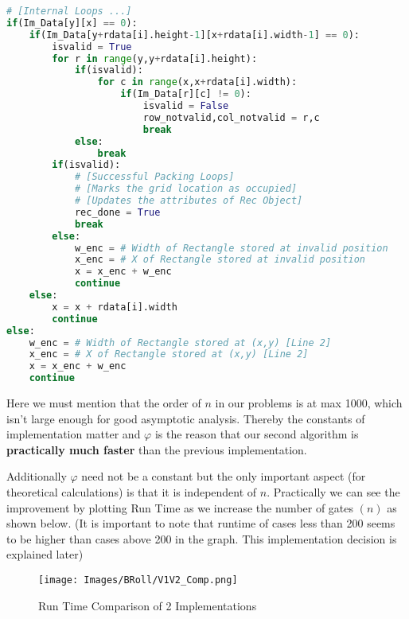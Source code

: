 \documentclass[12pt, a4paper,openany]{article}
\begin{document}
\begin{lstlisting}[language=Python, caption= Inner loops of Predictive Pixel Scan Implementation]
# [Internal Loops ...]
if(Im_Data[y][x] == 0):
    if(Im_Data[y+rdata[i].height-1][x+rdata[i].width-1] == 0):
        isvalid = True
        for r in range(y,y+rdata[i].height):
            if(isvalid):
                for c in range(x,x+rdata[i].width):
                    if(Im_Data[r][c] != 0):
                        isvalid = False
                        row_notvalid,col_notvalid = r,c
                        break                                            
            else:
                break        
        if(isvalid):
            # [Successful Packing Loops]
            # [Marks the grid location as occupied]
            # [Updates the attributes of Rec Object]
            rec_done = True
            break
        else:
            w_enc = # Width of Rectangle stored at invalid position
            x_enc = # X of Rectangle stored at invalid position
            x = x_enc + w_enc 
            continue        
    else:
        x = x + rdata[i].width
        continue
else:
    w_enc = # Width of Rectangle stored at (x,y) [Line 2]
    x_enc = # X of Rectangle stored at (x,y) [Line 2]
    x = x_enc + w_enc 
    continue
\end{lstlisting}
\begin{flushleft}
    Here we must mention that the order of \(n\) in our problems is at max 1000, which isn't large enough for good asymptotic analysis. Thereby the constants of implementation matter and \(\varphi\) is the reason that our second algorithm is \textbf{practically much faster} than the previous implementation. 
\end{flushleft}
\begin{flushleft}
    Additionally \(\varphi\) need not be a constant but the only important aspect (for theoretical calculations) is that it is independent of \(n\). Practically we can see the improvement by plotting Run Time as we increase the number of gates \((n)\) as shown below. (It is important to note that runtime of cases less than 200 seems to be higher than cases above 200 in the graph. This implementation decision is explained later)
\end{flushleft}
\begin{figure}[ht]
    \centering
    \texttt{[image: Images/BRoll/V1V2\_Comp.png]}
    \caption{Run Time Comparison of 2 Implementations}
    \label{fig:enter-label}
\end{figure}
\end{document}
